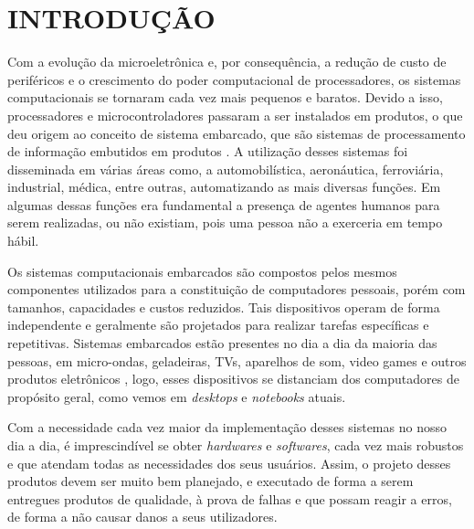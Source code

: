 
\chapter{INTRODUÇÃO}
\label{chap:introducao}
Com a evolução da microeletrônica e, por consequência, a redução de custo de periféricos e o crescimento do poder computacional de processadores, os sistemas computacionais se tornaram cada vez mais pequenos e baratos. Devido a isso, processadores e microcontroladores passaram a ser instalados em produtos, o que deu origem ao conceito de sistema embarcado, que são sistemas de processamento de informação embutidos em produtos \cite{Marwedel2006}.
A utilização desses sistemas foi disseminada em várias áreas como, a automobilística, aeronáutica, ferroviária, industrial, médica, entre outras, automatizando as mais diversas funções. Em algumas dessas funções era fundamental a presença de agentes humanos para serem realizadas, ou não existiam, pois uma pessoa não a exerceria em tempo hábil.



Os sistemas computacionais embarcados são compostos pelos mesmos componentes utilizados para a constituição de computadores pessoais, porém com tamanhos, capacidades e custos reduzidos. Tais dispositivos operam de forma independente e geralmente são projetados para realizar tarefas específicas e repetitivas. 
Sistemas embarcados estão presentes no dia a dia da maioria das pessoas, em micro-ondas, geladeiras, TVs, aparelhos de som, video games e outros produtos eletrônicos \cite{Marwedel2006}, logo, esses dispositivos se distanciam dos computadores de propósito geral, como vemos em \textit{desktops} e \textit{notebooks} atuais. 




Com a necessidade cada vez maior da implementação desses sistemas no nosso dia a dia, é imprescindível se obter \textit{hardwares} e \textit{softwares}, cada vez mais robustos e que atendam todas as necessidades dos seus usuários.
Assim, o projeto desses produtos devem ser muito bem planejado, e executado de forma a serem entregues produtos de qualidade, à  prova de falhas e que possam reagir a erros, de forma a não causar danos a seus utilizadores. 

